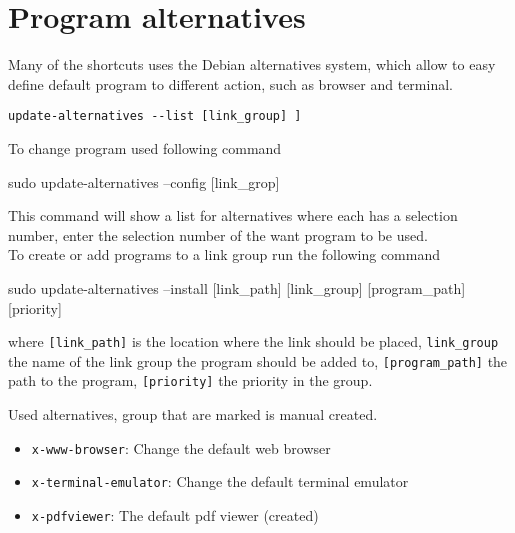 \documentclass{article}
\begin{document}
\section{Program alternatives}
\label{sec:alternatives}
Many of the shortcuts uses the Debian alternatives system, which allow to easy define default program to different action, such as browser and terminal.

\begin{lstlisting}[languagae=bash] 
  update-alternatives --list [link_group] ] 
\end{lstlisting}

To change program used following command
\begin{listlisting}[languagae=bash]
   sudo update-alternatives --config [link_grop] 
\end{listlisting}

This command will show a list for alternatives where each has a selection number, enter the selection number of the want program to be used. \\

To create or add programs to a link group run the following command

\begin{listlisting}[languagae=bash]
   sudo update-alternatives --install [link_path]  [link_group] [program_path] [priority]  
\end{listlisting}
where \verb|[link_path]| is the location where the link should be placed, \verb|link_group| the name of the link group the program should be added to, \verb|[program_path]| the path to the program, \verb|[priority]| the priority in the group. 

Used alternatives, group that are marked is manual created.
\begin{itemize}
	\item \verb|x-www-browser|: Change the default web browser
	\item \verb|x-terminal-emulator|: Change the default terminal emulator
	\item \verb|x-pdfviewer|: The default pdf viewer (created)
\end{itemize}
\end{document}

